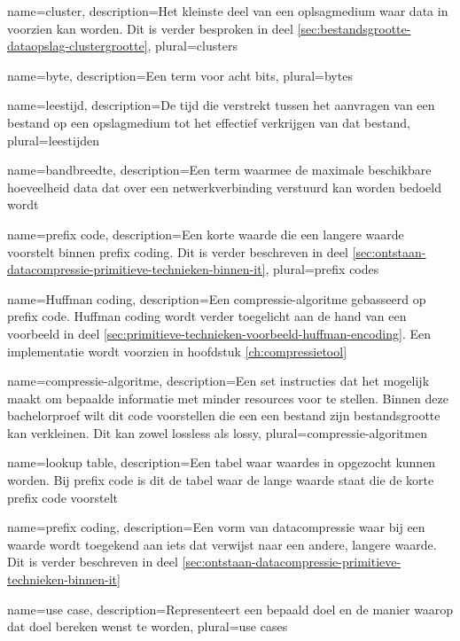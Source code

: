 {
	name={cluster},
	description={Het kleinste deel van een oplsagmedium waar data in voorzien kan worden. Dit is verder besproken in deel \ref{sec:bestandsgrootte-dataopslag-clustergrootte}},
	plural={clusters}
}

{
	name={byte},
	description={Een term voor acht bits},
	plural={bytes}
}

{
	name={leestijd},
	description={De tijd die verstrekt tussen het aanvragen van een bestand op een opslagmedium tot het effectief verkrijgen van dat bestand},
	plural={leestijden}
}

{
	name={bandbreedte},
	description={Een term waarmee de maximale beschikbare hoeveelheid data dat over een netwerkverbinding verstuurd kan worden bedoeld wordt}
}

{
	name={prefix code},
	description={Een korte waarde die een langere waarde voorstelt binnen prefix coding. Dit is verder beschreven in deel \ref{sec:ontstaan-datacompressie-primitieve-technieken-binnen-it}},
	plural={prefix codes}
}

{
	name={Huffman coding},
	description={Een compressie-algoritme gebasseerd op prefix code. Huffman coding wordt verder toegelicht aan de hand van een voorbeeld in deel \ref{sec:primitieve-technieken-voorbeeld-huffman-encoding}. Een implementatie wordt voorzien in hoofdstuk \ref{ch:compressietool}}
}

{
	name={compressie-algoritme},
	description={Een set instructies dat het mogelijk maakt om bepaalde informatie met minder resources voor te stellen. Binnen deze bachelorproef wilt dit code voorstellen die een een bestand zijn bestandsgrootte kan verkleinen. Dit kan zowel lossless als lossy},
	plural={compressie-algoritmen}
}

{
	name={lookup table},
	description={Een tabel waar waardes in opgezocht kunnen worden. Bij prefix code is dit de tabel waar de lange waarde staat die de korte prefix code voorstelt}
}

{
	name={prefix coding},
	description={Een vorm van datacompressie waar bij een waarde wordt toegekend aan iets dat verwijst naar een andere, langere waarde. Dit is verder beschreven in deel \ref{sec:ontstaan-datacompressie-primitieve-technieken-binnen-it}}
}

{
	name={use case},
	description={Representeert een bepaald doel en de manier waarop dat doel bereken wenst te worden},
	plural={use cases}
}

